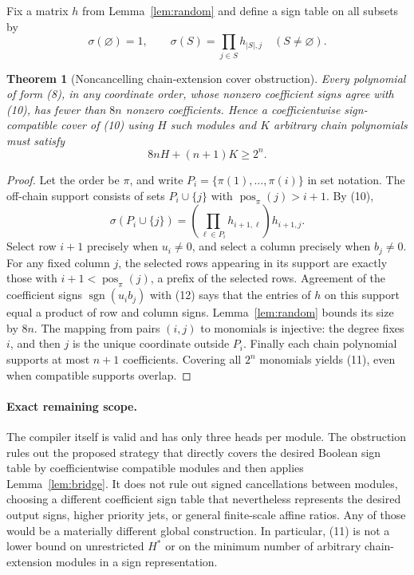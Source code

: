 \documentclass[11pt]{article}
\newtheorem{theorem}{Theorem}
\begin{document}
Fix a matrix $h$ from Lemma~\ref{lem:random} and define a sign
table on all subsets by
\[
 \sigma(\varnothing)=1,\qquad
 \sigma(S)=\prod_{j\in S}h_{|S|,j}
                   \quad(S\ne\varnothing).        \tag{10}
\]

\begin{theorem}[Noncancelling chain-extension cover obstruction]
Every polynomial of form (8), in any coordinate order, whose
nonzero coefficient signs agree with (10), has fewer than $8n$
nonzero coefficients. Hence a coefficientwise sign-compatible
cover of (10) using $H$ such modules and $K$ arbitrary chain
polynomials must satisfy
\[
                         8nH+(n+1)K\ge2^n.          \tag{11}
\]
\end{theorem}

\begin{proof}
Let the order be $\pi$, and write
$P_i=\{\pi(1),\ldots,\pi(i)\}$ in set notation. The off-chain
support consists of sets $P_i\cup\{j\}$ with
$\operatorname{pos}_\pi(j)>i+1$. By (10),
\[
 \sigma(P_i\cup\{j\})
 =\left(\prod_{\ell\in P_i}h_{i+1,\ell}\right)h_{i+1,j}.
                                                        \tag{12}
\]
Select row $i+1$ precisely when $u_i\ne0$, and select a column
precisely when $b_j\ne0$. For any fixed column $j$, the selected
rows appearing in its support are exactly those with
$i+1<\operatorname{pos}_\pi(j)$, a prefix of the selected rows.
Agreement of the coefficient signs $\operatorname{sgn}(u_i b_j)$
with (12) says that the entries of $h$ on this support equal a
product of row and column signs. Lemma~\ref{lem:random} bounds its
size by $8n$. The mapping from pairs $(i,j)$ to monomials is
injective: the degree fixes $i$, and then $j$ is the unique
coordinate outside $P_i$. Finally each chain polynomial supports
at most $n+1$ coefficients. Covering all $2^n$ monomials yields
(11), even when compatible supports overlap.
\end{proof}

\paragraph{Exact remaining scope.}
The compiler itself is valid and has only three heads per module.
The obstruction rules out the proposed strategy that directly covers
the desired Boolean sign table by coefficientwise compatible modules
and then applies Lemma~\ref{lem:bridge}. It does not rule out signed
cancellations between modules, choosing a different coefficient sign
table that nevertheless represents the desired output signs, higher
priority jets, or general finite-scale affine ratios. Any of those
would be a materially different global construction. In particular,
(11) is not a lower bound on unrestricted $H^*$ or on the minimum
number of arbitrary chain-extension modules in a sign representation.
\end{document}
